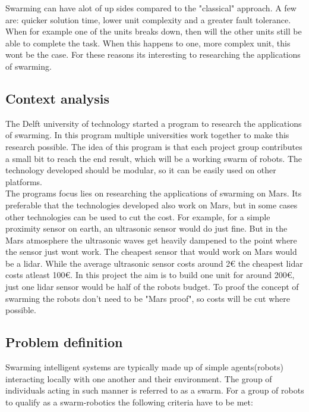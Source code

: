 \documentclass[10pt,a4paper]{article}
\begin{document}
Swarming can have alot of up sides compared to the "classical" approach. A few are: quicker solution time, lower unit complexity and a greater fault tolerance\cite{swarmintelligence}. When for example one of the units breaks down, then will the other units still be able to complete the task. When this happens to one, more complex unit, this wont be the case. For these reasons its interesting to researching the applications of swarming.



\subsection{Context analysis}
The Delft university of technology started a program to research the applications of swarming. In this program multiple universities work together to make this research possible. The idea of this program is that each project group contributes a small bit to reach the end result, which will be a working swarm of robots. The technology developed should be modular, so it can be easily used on other platforms.\\The programs focus lies on researching the applications of swarming on Mars. Its preferable that the technologies developed also work on Mars, but in some cases other technologies can be used to cut the cost. For example, for a simple proximity sensor on earth, an ultrasonic sensor would do just fine. But in the Mars atmosphere the ultrasonic waves get heavily dampened to the point where the sensor just wont work\cite{soundonmars}. The cheapest sensor that would work on Mars would be a lidar\cite{lidarmars}. While the average ultrasonic sensor costs around 2$\euro$ the cheapest lidar costs atleast 100$\euro$. In this project the aim is to build one unit for around 200$\euro$, just one lidar sensor would be half of the robots budget. To proof the concept of swarming the robots don't need to be "Mars proof", so costs will be cut where possible.\\

\subsection{Problem definition}
Swarming intelligent systems are typically made up of simple agents(robots) interacting locally with one another and their environment. The group of individuals acting in such manner is referred to as a swarm\cite{swarmintelligence}. For a group of robots to qualify as a swarm-robotics the following criteria have to be met:
\end{document}
